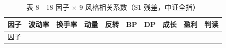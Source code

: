 \documentclass[UTF8,a4paper,zihao=-4,fontset=windows]{ctexart}
\begin{document}
\begin{longtable}[]{@{}
  >{\raggedright\arraybackslash}p{}
  >{\raggedright\arraybackslash}p{}
  >{\raggedright\arraybackslash}p{}
  >{\raggedright\arraybackslash}p{}
  >{\raggedright\arraybackslash}p{}
  >{\raggedright\arraybackslash}p{}
  >{\raggedright\arraybackslash}p{}
  >{\raggedright\arraybackslash}p{}
  >{\raggedright\arraybackslash}p{}
  >{\raggedright\arraybackslash}p{}@{}}
\caption{表 8　18 因子 × 9 风格相关系数（S1
残差，中证全指）}\tabularnewline
\toprule\noalign{}
\begin{minipage}[b]{\linewidth}\raggedright
因子
\end{minipage} & \begin{minipage}[b]{\linewidth}\raggedright
波动率
\end{minipage} & \begin{minipage}[b]{\linewidth}\raggedright
换手率
\end{minipage} & \begin{minipage}[b]{\linewidth}\raggedright
动量
\end{minipage} & \begin{minipage}[b]{\linewidth}\raggedright
反转
\end{minipage} & \begin{minipage}[b]{\linewidth}\raggedright
BP
\end{minipage} & \begin{minipage}[b]{\linewidth}\raggedright
DP
\end{minipage} & \begin{minipage}[b]{\linewidth}\raggedright
成长
\end{minipage} & \begin{minipage}[b]{\linewidth}\raggedright
盈利
\end{minipage} & \begin{minipage}[b]{\linewidth}\raggedright
判读
\end{minipage} \\
\midrule\noalign{}
\endfirsthead
\toprule\noalign{}
\begin{minipage}[b]{\linewidth}\raggedright
因子
\end{minipage} & \begin{minipage}[b]{\linewidth}\raggedright

\end{minipage}
\end{longtable}
\end{document}
